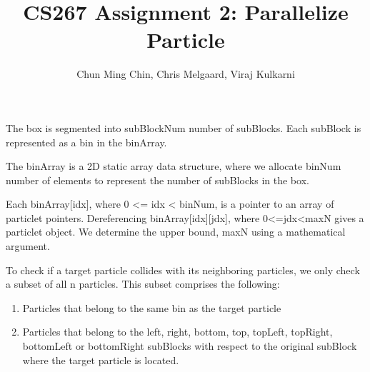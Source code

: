 \documentclass[11pt]{amsart}
\title{CS267 Assignment 2: Parallelize Particle}
\author{Chun Ming Chin, Chris Melgaard, Viraj Kulkarni }
\begin{document}
\maketitle



The box is segmented into subBlockNum number of subBlocks. Each subBlock is represented as a bin in the binArray.

The binArray is a 2D static array data structure, where we allocate binNum number of elements to represent the number of subBlocks in the box. 

Each binArray[idx], where 0 <= idx < binNum, is a pointer to an array of particlet pointers. Dereferencing binArray[idx][jdx], where 0<=jdx<maxN gives a particlet object. We determine the upper bound, maxN using a mathematical argument. 

To check if a target particle collides with its neighboring particles, we only check a subset of all n particles. This subset comprises the following: 
\begin{enumerate}
\item Particles that belong to the same bin as the target particle
\item Particles that belong to the left, right, bottom, top, topLeft, topRight, bottomLeft or bottomRight subBlocks with respect to the original subBlock where the target particle is located. 
\end{enumerate}
\end{document}
